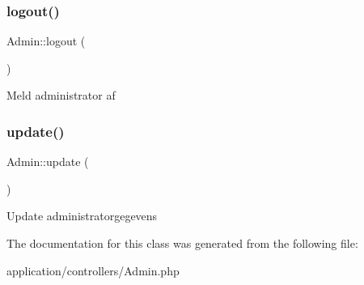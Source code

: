 \subsubsection{\texorpdfstring{logout()}{logout()}}
{\footnotesize\ttfamily Admin\+::logout (\begin{DoxyParamCaption}{ }\end{DoxyParamCaption})}

Meld administrator af \mbox{\label{class_admin_a5c7b585615c86fd80fe4b2dd8e282da0}} 
\subsubsection{\texorpdfstring{update()}{update()}}
{\footnotesize\ttfamily Admin\+::update (\begin{DoxyParamCaption}{ }\end{DoxyParamCaption})}

Update administratorgegevens 

The documentation for this class was generated from the following file\+:\begin{DoxyCompactItemize}
\item 
application/controllers/Admin.\+php\end{DoxyCompactItemize}
